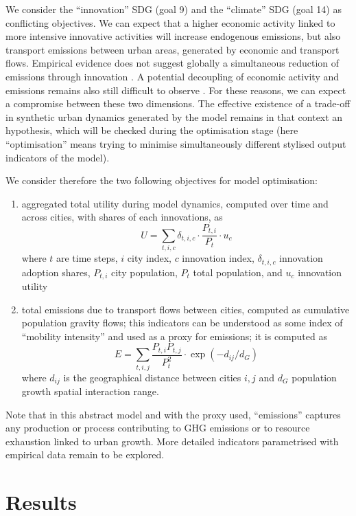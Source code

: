 \documentclass[final,5p,times,twocolumn,authoryear]{elsarticle}
\begin{document}
We consider the ``innovation'' SDG (goal 9) and the ``climate'' SDG (goal 14) as conflicting objectives. We can expect that a higher economic activity linked to more intensive innovative activities will increase endogenous emissions, but also transport emissions between urban areas, generated by economic and transport flows. Empirical evidence does not suggest globally a simultaneous reduction of emissions through innovation \citep{chen2020does}. A potential decoupling of economic activity and emissions remains also still difficult to observe \citep{haberl2020systematic}. For these reasons, we can expect a compromise between these two dimensions. The effective existence of a trade-off in synthetic urban dynamics generated by the model remains in that context an hypothesis, which will be checked during the optimisation stage (here ``optimisation'' means trying to minimise simultaneously different stylised output indicators of the model).

We consider therefore the two following objectives for model optimisation:

\begin{enumerate}
 \item aggregated total utility during model dynamics, computed over time and across cities, with shares of each innovations, as
 \[
 U = \sum_{t,i,c} \delta_{t,i,c} \cdot \frac{P_{t,i}}{P_t} \cdot u_c
 \]
 where $t$ are time steps, $i$ city index, $c$ innovation index, $\delta_{t,i,c}$ innovation adoption shares, $P_{t,i}$ city population, $P_t$ total population, and $u_c$ innovation utility
 \item total emissions due to transport flows between cities, computed as cumulative population gravity flows; this indicators can be understood as some index of ``mobility intensity'' and used as a proxy for emissions; it is computed as
 \[
 E = \sum_{t,i,j} \frac{P_{t,i}P_{t,j}}{P_t^2} \cdot \exp\left(- d_{ij} / d_G\right)
 \]
 where $d_{ij}$ is the geographical distance between cities $i,j$ and $d_G$ population growth spatial interaction range.
\end{enumerate}

Note that in this abstract model and with the proxy used, ``emissions'' captures any production or process contributing to GHG emissions or to resource exhaustion linked to urban growth. More detailed indicators parametrised with empirical data remain to be explored.



\section{Results}
\end{document}
